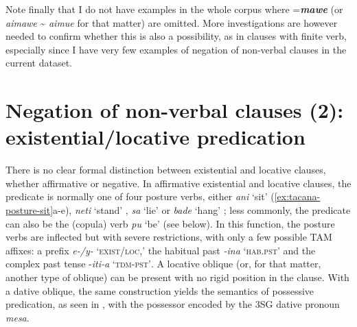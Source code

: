 \documentclass[output=paper]{langsci/langscibook}
\begin{document}
%
Note finally that I do not have examples in the whole corpus where
=\textbf{\textit{mawe}} (or \textit{aimawe} {\textasciitilde}
\textit{aimue} for that matter) are omitted. More investigations are
however needed to confirm whether this is also a possibility, as in clauses
with finite verb, especially since I have very few examples of negation of
non-verbal clauses in the current dataset.

\section{Negation of non-verbal clauses (2): existential\slash locative predication}
\label{sec:tacana-5}

There is no clear formal distinction between existential and locative
clauses, whether affirmative or negative. In affirmative existential and
locative clauses, the predicate is normally one of four posture verbs,
either \textit{ani} `sit' (\ref{ex:tacana-posture-sit}a-e), \textit{neti}
`stand' , \textit{sa} `lie'
 or \textit{bade} `hang'
; less commonly, the predicate can also be the
(copula) verb \textit{pu} `be' (see below). In this function, the posture
verbs are inflected but with severe restrictions, with only a few possible
TAM affixes: a prefix \textit{e-/y-} `\textsc{exist\slash loc},' the habitual
past \textit{-ina} `\textsc{hab.pst}' and the complex past tense
-\textit{iti-a} `\textsc{tdm-pst'}. A locative oblique (or, for that
matter, another type of oblique) can be present with no rigid position in
the clause. With a dative oblique, the same construction yields the
semantics of possessive predication, as seen in
, with the possessor encoded by the 3SG dative pronoun \textit{mesa}.
%
\end{document}
